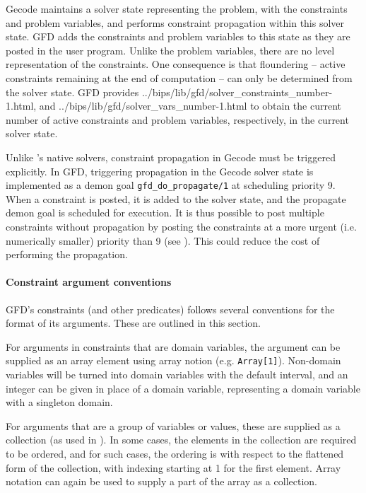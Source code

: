 Gecode maintains a solver state representing the problem, with the constraints
and problem variables, and performs constraint propagation within this solver
state. GFD adds the constraints and problem variables to this state
as they are posted in the user program. Unlike
the problem variables, there are no \eclipse level representation of the
constraints. One consequence is that floundering -- active constraints 
remaining at the end of computation -- can only be determined from the solver
state. GFD provides 
{../bips/lib/gfd/solver_constraints_number-1.html},  
and 
{../bips/lib/gfd/solver_vars_number-1.html} to obtain the current number of
active constraints and problem variables, respectively, in the current solver
state.

Unlike \eclipse's native solvers, constraint propagation in Gecode must be 
triggered explicitly. In GFD, triggering propagation in the Gecode solver state
is implemented as a demon goal {\tt gfd_do_propagate/1} at scheduling 
priority 9.
When a constraint is posted, it is added to the solver state,
and the propagate demon goal is
scheduled for execution. It is thus possible to post multiple
 constraints without propagation by posting the constraints at a more
urgent (i.e. numerically smaller) priority than 9 (see
).
This could reduce the cost of performing the propagation.

\paragraph{Constraint argument conventions}

GFD's constraints (and other predicates) follows several conventions 
for the format of its arguments. These are outlined in this section.

For arguments in constraints that are domain variables, the argument 
can be supplied as an
array element using array notion (e.g. \verb|Array[1]|).
Non-domain variables will be turned into domain variables with the default 
interval, and an integer can be given in place of a domain variable, 
representing a domain variable with a singleton domain. 

For arguments that are a group of variables or values, these are supplied
as a collection  
(as used in ). In some cases, the elements in the collection are required to be 
ordered, and for such cases, the ordering is 
with respect to the flattened form of the collection, with indexing starting
at 1 for the first element. Array notation can again be used to supply a 
part of the array as a collection.

